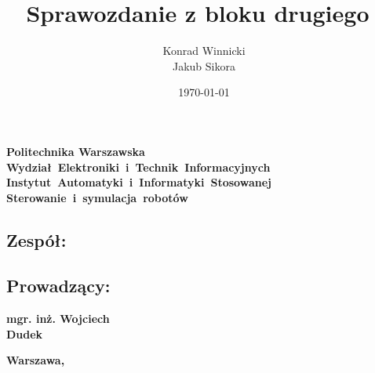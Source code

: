 \documentclass{mwrep}
\title{\bf Sprawozdanie z bloku drugiego \vskip 0.1cm}
\author{Konrad Winnicki \\ Jakub Sikora}
\date{\today}
\begin{document}
\makeatletter
\renewcommand{\maketitle}{\begin{titlepage}
		\begin{center}{
				\LARGE {\bf Politechnika Warszawska}}\\
            \vspace{0.4cm}
            \leftskip-0.9cm
            {\LARGE {\bf \mbox{Wydział Elektroniki i Technik Informacyjnych}}}\\
            \vspace{0.2cm}
            {\LARGE {\bf \mbox{Instytut Automatyki i Informatyki Stosowanej}}}\\
            
            \vspace{5cm}
            \leftskip-0.5cm
			{\bf \Huge \mbox{Sterowanie i symulacja robotów} \vskip 0.1cm}
		\end{center}
		\vspace{0.1cm}

		\begin{center}
			{\bf \LARGE \@title}
		\end{center}

		\vspace{10cm}
		\begin{paracol}{2}
			\addtocontents{toc}{\protect\setcounter{tocdepth}{1}}
			\subsection*{Zespół:}
			\bf{ \Large{ \noindent\@author \par}}
			\addtocontents{toc}{\protect\setcounter{tocdepth}{2}}

			\switchcolumn \addtocontents{toc}{\protect\setcounter{tocdepth}{1}}
			\subsection*{Prowadzący:}
			\bf{\Large{\noindent mgr. inż. Wojciech \\ Dudek}}
			\addtocontents{toc}{\protect\setcounter{tocdepth}{2}}

		\end{paracol}
		\vspace*{\stretch{6}}
		\begin{center}
			\bf{\large{Warszawa, \@date\vskip 0.1cm}}
		\end{center}
	\end{titlepage}
}
\makeatother
\maketitle
\end{document}
